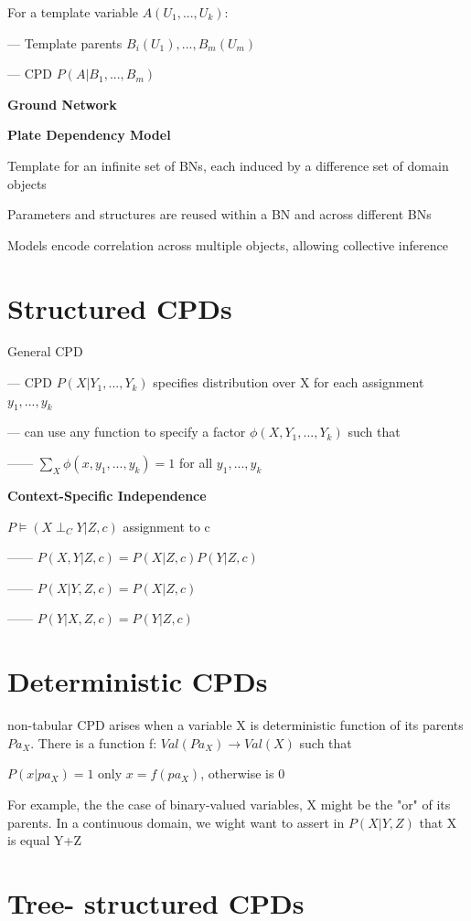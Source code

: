 \documentclass{book}
\begin{document}
For a template variable $A(U_1,...,U_k)$:

--- Template parents $B_i(U_1), ..., B_m(U_m)$

--- CPD $P(A|B_1,...,B_m)$

\textbf{Ground Network}

\textbf{Plate Dependency Model}

Template for an infinite set of BNs, each induced by a difference set of domain objects

Parameters and structures are reused within a BN and across different BNs

Models encode correlation across multiple objects, allowing collective inference

\section{Structured CPDs}
General CPD

--- CPD $P(X|Y_1,...,Y_k)$ specifies distribution over X for each assignment $y_1,...,y_k$

--- can use any function to specify a factor $\phi(X,Y_1,...,Y_k)$ such that

------ $\sum_{X}\phi(x,y_1,...,y_k) = 1$ for all $y_1,...,y_k$

\textbf{Context-Specific Independence}

$P \models (X \perp_C Y | Z,c)$ assignment to c

------ $P(X,Y | Z,c) = P(X|Z,c)P(Y|Z,c)$

------ $P(X | Y, Z,c) = P(X|Z,c)$

------ $P(Y | X, Z,c) = P(Y|Z,c)$


\section{Deterministic CPDs}

non-tabular CPD arises when a variable X is deterministic function of its parents $Pa_X$. There is a function f: $Val(Pa_X) \rightarrow Val(X)$ such that

$P(x|pa_X) =1$ only $x=f(pa_X)$, otherwise is 0

For example, the the case of binary-valued variables, X might be the "or" of its parents. In a continuous domain, we wight want to assert in $P(X|Y,Z)$ that X is equal Y+Z



\section{Tree- structured CPDs}
\end{document}
